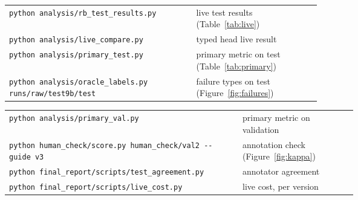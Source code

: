 \documentclass[10pt,a4paper]{article}
\renewcommand{\arraystretch}{1.05}
\newcommand{\code}[1]{\texttt{#1}}
\begin{document}
{\scriptsize\renewcommand{\arraystretch}{0.95}\noindent
\begin{minipage}[t]{0.46\linewidth}
\begin{tabularx}{\linewidth}{@{}>{\raggedright\arraybackslash}p{0.6\linewidth}Y@{}}
\code{python analysis/rb\_test\_results.py} & live test results (Table~\ref{tab:live}) \\
\code{python analysis/live\_compare.py} & typed head live result \\
\code{python analysis/primary\_test.py} & primary metric on test (Table~\ref{tab:primary}) \\
\code{python analysis/oracle\_labels.py runs/raw/test9b/test} & failure types on test (Figure~\ref{fig:failures}) \\
\end{tabularx}
\end{minipage}\hfill
\begin{minipage}[t]{0.52\linewidth}
\begin{tabularx}{\linewidth}{@{}>{\raggedright\arraybackslash}p{0.67\linewidth}Y@{}}
\code{python analysis/primary\_val.py} & primary metric on validation \\
\code{python human\_check/score.py human\_check/val2 -{}-guide v3} & annotation check (Figure~\ref{fig:kappa}) \\
\code{python final\_report/scripts/test\_agreement.py} & annotator agreement \\
\code{python final\_report/scripts/live\_cost.py} & live cost, per version \\
\end{tabularx}
\end{minipage}}
\end{document}
